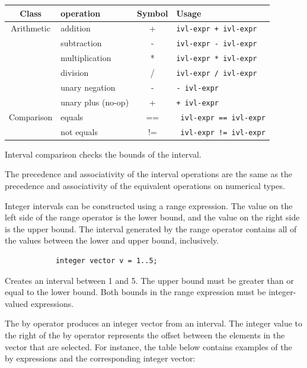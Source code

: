 \documentclass{article}
\begin{document}
		\begin{center}
			\begin{tabular}{|c|l|c|l|}
				\hline
				\textbf{Class} & \textbf{operation} & \textbf{Symbol} & \textbf{Usage} \\
				\hline
				Arithmetic & addition           & + & \texttt{ivl-expr + ivl-expr}  \\
				           & subtraction        & - &  \texttt{ivl-expr - ivl-expr}	\\
				           & multiplication     & * & \texttt{ivl-expr * ivl-expr}	\\
				           & division           & / & \texttt{ivl-expr / ivl-expr}	\\
				           & unary negation     & - & \texttt{- ivl-expr}	          \\
				           & unary plus (no-op) & + & \texttt{+ ivl-expr}           \\
				\hline
				Comparison & equals     & == & \texttt{ ivl-expr == ivl-expr} \\
				           & not equals & != & \texttt{ ivl-expr != ivl-expr} \\
				\hline
			\end{tabular}
		\end{center}

		Interval comparison checks the bounds of the interval.

		The precedence and associativity of the interval operations are the same as the precedence and associativity of
		the equivalent operations on numerical types.

		Integer intervals can be constructed using a range expression. The value on the left side of the range operator
		is the lower bound, and the value on the right side is the upper bound. The interval generated by the range
		operator contains all of the values between the lower and upper bound, inclusively.

		\begin{lstlisting}
			integer vector v = 1..5;
		\end{lstlisting}

		Creates an interval between 1 and 5. The upper bound must be greater than or equal to the lower bound. Both
		bounds in the range expression must be integer-valued expressions.

		The by operator produces an integer vector from an interval. The integer value to the right of the by operator
		represents the offset between the elements in the vector that are selected. For instance, the table below
		contains examples of the by expressions and the corresponding integer vector:
\end{document}

